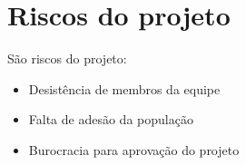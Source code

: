 \section{Riscos do projeto}

  São riscos do projeto:

  \begin{itemize}
    \item Desistência de membros da equipe
    \item Falta de adesão da população
    \item Burocracia para aprovação do projeto
  \end{itemize}
